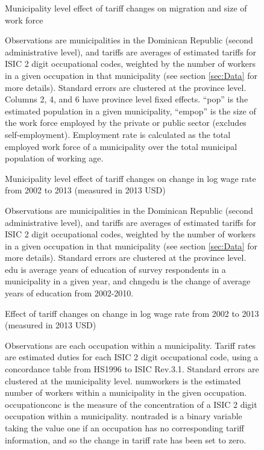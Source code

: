 \begin{landscape}
\begin{figure}[H]
\begin{center}
Municipality level effect of tariff changes on migration and size of work force

\caption{\label{fig:Table3}}
\end{center}
Observations are municipalities in the Dominican Republic (second administrative level),
and tariffs are averages of estimated tariffs for ISIC 2 digit occupational codes,
weighted by the number of workers in a given occupation in that municipality 
(see section \ref{sec:Data} for more details). Standard errors are clustered at the province level.
Columns 2, 4, and 6 have province level fixed effects.
``pop'' is the estimated population in a given municipality, ``empop'' is the size of
the work force employed by the private or public sector (excludes self-employment).
Employment rate is calculated as the total employed work force of a municipality
over the total municipal population of working age.
\end{figure}


\begin{figure}[H]
\begin{center}
Municipality level effect of tariff changes on change in log wage rate from 2002 to 2013 (measured
in 2013 USD)

\caption{\label{fig:Table1}}
\end{center}
Observations are municipalities in the Dominican Republic (second administrative level),
and tariffs are averages of estimated tariffs for ISIC 2 digit occupational codes,
weighted by the number of workers in a given occupation in that municipality 
(see section \ref{sec:Data} for more details). Standard errors are clustered at the province level.
edu is average years of education of survey respondents in a municipality in a given year,
and chngedu is the change of average years of education from 2002-2010.
\end{figure}

\begin{figure}[H]
\begin{center}
Effect of tariff changes on change in log wage rate from 2002 to 2013 (measured in 2013 USD)

\caption{\label{fig:Table2}}
\end{center}
Observations are each occupation within a municipality.
Tariff rates are estimated duties for each ISIC 2 digit occupational code,
using a concordance table from HS1996 to ISIC Rev.3.1. Standard errors are clustered at the 
municipality level. numworkers is the estimated
number of workers within a municipality in the given occupation. occupationconc is the measure of
the concentration of a ISIC 2 digit occupation within a municipality. nontraded is a binary variable
taking the value one if an occupation has no corresponding tariff information, and so the change in
tariff rate has been set to zero.
\end{figure}


\end{landscape}
